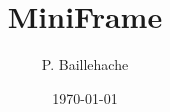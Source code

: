 \documentclass[12pt, a4paper]{article}
\begin{document}
\title{MiniFrame}
\author{P. Baillehache}
\date{\today}
\maketitle

\tableofcontents


\end{document}

